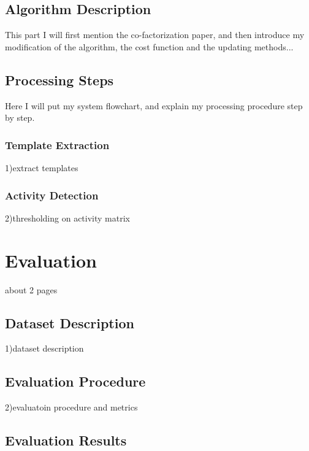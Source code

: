 \documentclass{article}
\begin{document}
\subsection{Algorithm Description}\label{subsec:algorithm description}

This part I will first mention the co-factorization paper, and then introduce my modification of the algorithm, the cost function and the updating methods...

\subsection{Processing Steps}\label{subsec:processing steps}

Here I will put my system flowchart, and explain my processing procedure step by step. 

\subsubsection{Template Extraction}\label{subsubsec:template extraction}
1)extract templates

\subsubsection{Activity Detection}\label{subsubsec:activity detection}
2)thresholding on activity matrix


\section{Evaluation}\label{sec:Evaluation}

about 2 pages

\subsection{Dataset Description}\label{subsec:dataset description}

1)dataset description

\subsection{Evaluation Procedure}\label{subsec:evaluation procedure}

2)evaluatoin procedure and metrics

\subsection{Evaluation Results}\label{subsec:evaluation results}
\end{document}
